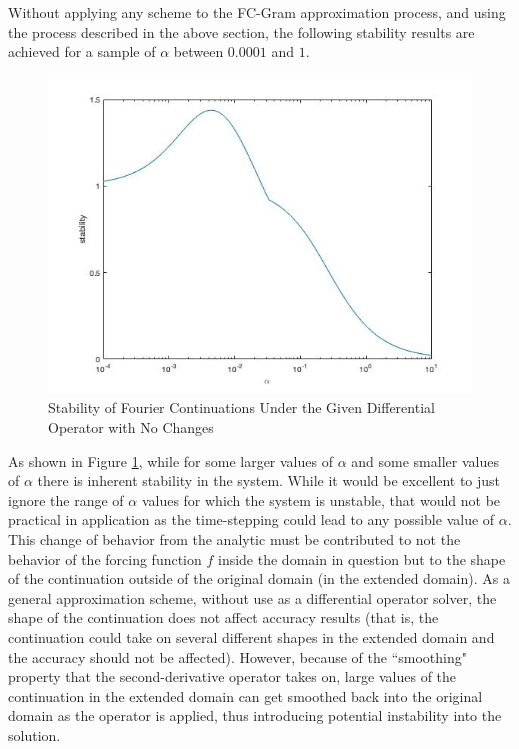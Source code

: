 \documentclass[11pt]{amsart}
\begin{document}
Without applying any scheme to the FC-Gram approximation process, and using the process described in the above section, the following stability results are achieved for a sample of $\alpha$ between $0.0001$ and $1$. 
\begin{figure}[htbp]
\begin{center}
\includegraphics[scale=0.5]{StabilityGraphDeg0.jpg}
\caption{Stability of Fourier Continuations Under the Given Differential Operator with No Changes}
\label{Stab1}
\end{center}  
\end{figure}
As shown in Figure \ref{Stab1}, while for some larger values of $\alpha$ and some smaller values of $\alpha$ there is inherent stability in the system. While it would be excellent to just ignore the range of $\alpha$ values for which the system is unstable, that would not be practical in application as the time-stepping could lead to any possible value of $\alpha$.  
This change of behavior from the analytic must be contributed to not the behavior of the forcing function $f$ inside the domain in question but to the shape of the continuation outside of the original domain (in the extended domain).  As a general approximation scheme, without use as a differential operator solver, the shape of the continuation does not affect accuracy results (that is, the continuation could take on several different shapes in the extended domain and the accuracy should not be affected).  However, because of the ``smoothing" property that the second-derivative operator takes on, large values of the continuation in the extended domain can get smoothed back into the original domain as the operator is applied, thus introducing potential instability into the solution.
\end{document}
